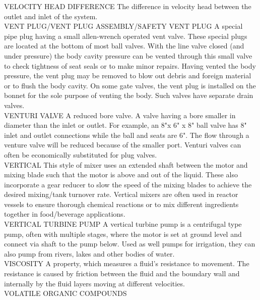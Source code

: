 VELOCITY HEAD DIFFERENCE
The difference in velocity head between the outlet and inlet of the system.
\vspace{0.3cm}\\
VENT PLUG/VENT PLUG ASSEMBLY/SAFETY VENT PLUG
A special pipe plug having a small allen-wrench operated vent valve. These special plugs are located at the bottom of most ball valves. With the line valve closed (and under pressure) the body cavity pressure can be vented through this small valve to check tightness of seat seals or to make minor repairs. Having vented the body pressure, the vent plug may be removed to blow out debris and foreign material or to flush the body cavity. On some gate valves, the vent plug is installed on the bonnet for the sole purpose of venting the body. Such valves have separate drain valves.
\vspace{0.3cm}\\
VENTURI VALVE
A reduced bore valve. A valve having a bore smaller in diameter than the inlet or outlet. For example, an 8"x 6" x 8" ball valve has 8" inlet and outlet connections while the ball and seats are 6". The flow through a venture valve will be reduced because of the smaller port. Venturi valves can often be economically substituted for plug valves.
\vspace{0.3cm}\\
VERTICAL
This style of mixer uses an extended shaft between the motor and mixing blade such that the motor is above and out of the liquid. These also incorporate a gear reducer to slow the speed of the mixing blades to achieve the desired mixing/tank turnover rate. Vertical mixers are often used in reactor vessels to ensure thorough chemical reactions or to mix different ingredients together in food/beverage applications.
\vspace{0.3cm}\\
VERTICAL TURBINE PUMP
A vertical turbine pump is a centrifugal type pump, often with multiple stages, where the motor is set at ground level and connect via shaft to the pump below. Used as well pumps for irrigation, they can also pump from rivers, lakes and other bodies of water.
\vspace{0.3cm}\\
VISCOSITY
A property, which measures a fluid’s resistance to movement. The resistance is caused by friction between the fluid and the boundary wall and internally by the fluid layers moving at different velocities.
\vspace{0.3cm}\\
VOLATILE ORGANIC COMPOUNDS
